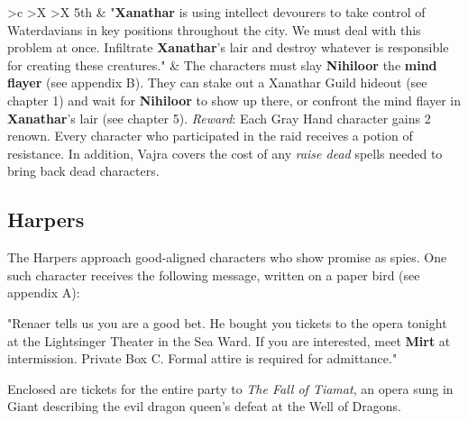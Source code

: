 \documentclass[10pt,a4paper,twoside,twocolumn,openany,nodeprecatedcode]{dndbook}
\begin{document}
\begin{DndTable}{>{\hsize}c >{\hsize}X >{\hsize}X}
5th & "\textbf{Xanathar} is using intellect devourers to take control of Waterdavians in key positions throughout the city. We must deal with this problem at once. Infiltrate \textbf{Xanathar}'s lair and destroy whatever is responsible for creating these creatures." & The characters must slay \textbf{Nihiloor} the \textbf{mind flayer} (see appendix B). They can stake out a Xanathar Guild hideout (see chapter 1) and wait for \textbf{Nihiloor} to show up there, or confront the mind flayer in \textbf{Xanathar}'s lair (see chapter 5). \textit{Reward}: Each Gray Hand character gains 2 renown. Every character who participated in the raid receives a potion of resistance. In addition, Vajra covers the cost of any \textit{raise dead} spells needed to bring back dead characters.\\
\end{DndTable}


\subsection{Harpers}
The Harpers approach good-aligned characters who show promise as spies. One such character receives the following message, written on a paper bird (see appendix A):
\begin{DndReadAloud}{}
"Renaer tells us you are a good bet. He bought you tickets to the opera tonight at the Lightsinger Theater in the Sea Ward. If you are interested, meet \textbf{Mirt} at intermission. Private Box C. Formal attire is required for admittance."
\end{DndReadAloud}

Enclosed are tickets for the entire party to \textit{The Fall of Tiamat}, an opera sung in Giant describing the evil dragon queen's defeat at the Well of Dragons.
\end{document}
